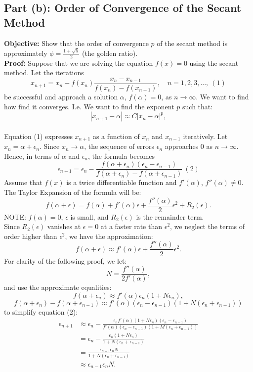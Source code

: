 \documentclass[12pt]{article}
\begin{document}
\subsection*{Part (b): Order of Convergence of the Secant Method}

\textbf{Objective:} Show that the order of convergence \( p \) of the secant method is approximately \( \phi = \frac{1 + \sqrt{5}}{2} \) (the golden ratio).
\\
\textbf{Proof: }
Suppose that we are solving the equation \( f(x) = 0 \) using the secant method. Let the iterations
\[
    x_{n+1} = x_n - f(x_n) \frac{x_n - x_{n-1}}{f(x_n) - f(x_{n-1})}, \quad n = 1, 2, 3, \ldots, \ (1)
\]
be successful and approach a solution \( \alpha \), \( f(\alpha) = 0 \), as \( n \to \infty \). We want to find how find it converges. 
I.e. We want to find the exponent \( p \) such that:
\[
    |x_{n+1} - \alpha| \approx C |x_n - \alpha|^p,
\]
\\
Equation (1) expresses \( x_{n+1} \) as a function of \( x_n \) and \( x_{n-1} \) iteratively.
Let \( x_n = \alpha + \epsilon_n \). Since \( x_n \to \alpha \), the sequence of errors \( \epsilon_n \) approaches 0 as \( n \to \infty \). Hence, in terms of \( \alpha \) and \( \epsilon_n \), the formula becomes
\[
    \epsilon_{n+1} = \epsilon_n - \frac{f(\alpha + \epsilon_n)(\epsilon_n - \epsilon_{n-1})}{f(\alpha + \epsilon_n) - f(\alpha + \epsilon_{n-1})} \ (2)
\]
Assume that \( f(x) \) is a twice differentiable function and \( f'(\alpha) \), \( f''(\alpha) \neq 0 \). The Taylor Expansion of the formula will be:
\[
    f(\alpha + \epsilon) = f(\alpha) + f'(\alpha) \epsilon + \frac{f''(\alpha)}{2} \epsilon^2 + R_2(\epsilon).
\]
NOTE: \( f(\alpha) = 0 \), \( \epsilon \) is small, and \( R_2(\epsilon) \) is the remainder term. 
\\
Since \( R_2(\epsilon) \) vanishes at \( \epsilon = 0 \) at a faster rate than \( \epsilon^2 \), we neglect the terms of order higher than \( \epsilon^2 \), we have the approximation:
\[
    f(\alpha + \epsilon) \approx f'(\alpha) \epsilon + \frac{f''(\alpha)}{2} \epsilon^2.
\]
For clarity of the following proof, we let:
\[
    N = \frac{f''(\alpha)}{2 f'(\alpha)},
\]
and use the approximate equalities:
\[
    f(\alpha + \epsilon_n) \approx f'(\alpha) \epsilon_n (1 + N \epsilon_n),
\]
\[
    f(\alpha + \epsilon_n) - f(\alpha + \epsilon_{n-1}) \approx f'(\alpha)(\epsilon_n - \epsilon_{n-1})(1 + N(\epsilon_n + \epsilon_{n-1}))
\]
to simplify equation (2):
\begin{align*}
    \epsilon_{n+1} &\approx \epsilon_n - \frac{\epsilon_n f'(\alpha)(1 + N \epsilon_n)(\epsilon_n - \epsilon_{n-1})}{f'(\alpha)(\epsilon_n - \epsilon_{n-1})(1 + M (\epsilon_n + \epsilon_{n-1}))} \\
    &= \epsilon_n - \frac{\epsilon_n (1 + N \epsilon_n)}{1 + N (\epsilon_n + \epsilon_{n-1})} \\
    &= \frac{\epsilon_{n-1} \epsilon_n N}{1 + N (\epsilon_n + \epsilon_{n-1})} \\
    &\approx \epsilon_{n-1} \epsilon_n N.
\end{align*}
\end{document}
